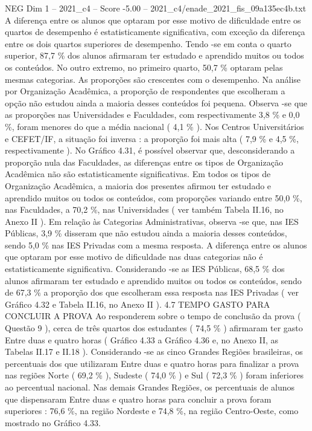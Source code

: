 \begin{textsample}{NEG Dim 1 – 2021\_c4 – Score -5.00 – 2021\_c4/enade\_2021\_fis\_09a135ec4b.txt}
A diferença entre os alunos que optaram por esse motivo de dificuldade entre os quartos de desempenho é estatisticamente significativa, com exceção da diferença entre os dois quartos superiores de desempenho.
Tendo -se em conta o quarto superior, 87,7 \% dos alunos afirmaram ter estudado e aprendido muitos ou todos os conteúdos.
No outro extremo, no primeiro quarto, 50,7 \% optaram pelas mesmas categorias.
As proporções são crescentes com o desempenho.
Na análise por Organização Acadêmica, a proporção de respondentes que escolheram a opção não estudou ainda a maioria desses conteúdos foi pequena.
Observa -se que as proporções nas Universidades e Faculdades, com respectivamente 3,8 \% e 0,0 \%, foram menores do que a média nacional ( 4,1 \% ).
Nos Centros Universitários e CEFET/IF, a situação foi inversa : a proporção foi mais alta ( 7,9 \% e 4,5 \%, respectivamente ).
No Gráfico 4.31, é possível observar que, desconsiderando a proporção nula das Faculdades, as diferenças entre os tipos de Organização Acadêmica não são estatisticamente significativas.
Em todos os tipos de Organização Acadêmica, a maioria dos presentes afirmou ter estudado e aprendido muitos ou todos os conteúdos, com proporções variando entre 50,0 \%, nas Faculdades, a 70,2 \%, nas Universidades ( ver também Tabela II.16, no Anexo II ).
Em relação às Categorias Administrativas, observa -se que, nas IES Públicas, 3,9 \% disseram que não estudou ainda a maioria desses conteúdos, sendo 5,0 \% nas IES Privadas com a mesma resposta.
A diferença entre os alunos que optaram por esse motivo de dificuldade nas duas categorias não é estatisticamente significativa.
Considerando -se as IES Públicas, 68,5 \% dos alunos afirmaram ter estudado e aprendido muitos ou todos os conteúdos, sendo de 67,3 \% a proporção dos que escolheram essa resposta nas IES Privadas ( ver Gráfico 4.32 e Tabela II.16, no Anexo II ). 4.7 TEMPO GASTO PARA CONCLUIR A PROVA Ao responderem sobre o tempo de conclusão da prova ( Questão 9 ), cerca de três quartos dos estudantes ( 74,5 \% ) afirmaram ter gasto Entre duas e quatro horas ( Gráfico 4.33 a Gráfico 4.36 e, no Anexo II, as Tabelas II.17 e II.18 ).
Considerando -se as cinco Grandes Regiões brasileiras, os percentuais dos que utilizaram Entre duas e quatro horas para finalizar a prova nas regiões Norte ( 69,2 \% ), Sudeste ( 74,0 \% ) e Sul ( 72,3 \% ) foram inferiores ao percentual nacional.
Nas demais Grandes Regiões, os percentuais de alunos que dispensaram Entre duas e quatro horas para concluir a prova foram superiores : 76,6 \%, na região Nordeste e 74,8 \%, na região Centro-Oeste, como mostrado no Gráfico 4.33.

\end{textsample}
